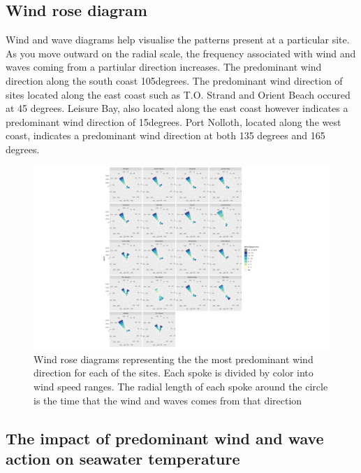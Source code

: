 \documentclass[12pt,a4paper,]{article}
\begin{document}
\hypertarget{wind-rose-diagram}{%
\subsection{Wind rose diagram}\label{wind-rose-diagram}}

Wind and wave diagrams help visualise the patterns present at a
particular site. As you move outward on the radial scale, the frequency
associated with wind and waves coming from a partiular direction
increases. The predominant wind direction along the south coast
105degrees. The predominant wind direction of sites located along the
east coast such as T.O. Strand and Orient Beach occured at 45 degrees.
Leisure Bay, also located along the east coast however indicates a
predominant wind direction of 15degrees. Port Nolloth, located along the
west coast, indicates a predominant wind direction at both 135 degrees
and 165 degrees.

\begin{figure}
\centering
\includegraphics{../figures/p.wr3.pdf}
\caption{Wind rose diagrams representing the the most predominant wind
direction for each of the sites. Each spoke is divided by color into
wind speed ranges. The radial length of each spoke around the circle is
the time that the wind and waves comes from that direction}
\end{figure}

\hypertarget{the-impact-of-predominant-wind-and-wave-action-on-seawater-temperature}{%
\subsection{The impact of predominant wind and wave action on seawater
temperature}\label{the-impact-of-predominant-wind-and-wave-action-on-seawater-temperature}}
\end{document}
